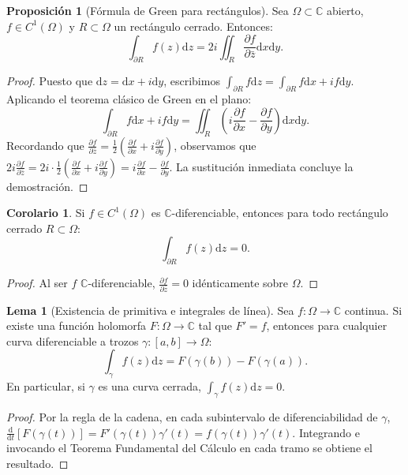 \documentclass[11pt,a4paper]{article}
\theoremstyle{definition}
\newtheorem{proposicion}{Proposición}[section]
\newtheorem{lema}{Lema}[section]
\newtheorem{corolario}{Corolario}[section]
\theoremstyle{remark}
\numberwithin{equation}{section}
\newcommand{\dz}{\mathrm{d}z}
\newcommand{\dt}{\mathrm{d}t}
\begin{document}
\begin{proposicion}[Fórmula de Green para rectángulos]
Sea $\Omega \subset \mathbb{C}$ abierto, $f \in C^1(\Omega)$ y $R \subset \Omega$ un rectángulo cerrado. Entonces:
\begin{equation}
\int_{\partial R} f(z) \dz = 2i \iint_R \frac{\partial f}{\partial \bar{z}} \mathrm{d}x\mathrm{d}y.
\end{equation}
\end{proposicion}
\begin{proof}
Puesto que $\dz = \mathrm{d}x + i\mathrm{d}y$, escribimos $\int_{\partial R} f \dz = \int_{\partial R} f \mathrm{d}x + i f \mathrm{d}y$. Aplicando el teorema clásico de Green en el plano:
\[
\int_{\partial R} f \mathrm{d}x + if \mathrm{d}y = \iint_R \left( i\frac{\partial f}{\partial x} - \frac{\partial f}{\partial y} \right) \mathrm{d}x\mathrm{d}y.
\]
Recordando que $\frac{\partial f}{\partial \bar{z}} = \frac{1}{2}\left(\frac{\partial f}{\partial x} + i\frac{\partial f}{\partial y}\right)$, observamos que $2i \frac{\partial f}{\partial \bar{z}} = 2i \cdot \frac{1}{2}\left(\frac{\partial f}{\partial x} + i\frac{\partial f}{\partial y}\right) = i\frac{\partial f}{\partial x} - \frac{\partial f}{\partial y}$. La sustitución inmediata concluye la demostración.
\end{proof}

\begin{corolario}
Si $f \in C^1(\Omega)$ es $\mathbb{C}$-diferenciable, entonces para todo rectángulo cerrado $R \subset \Omega$:
\begin{equation}
\int_{\partial R} f(z) \dz = 0.
\end{equation}
\end{corolario}
\begin{proof}
Al ser $f$ $\mathbb{C}$-diferenciable, $\frac{\partial f}{\partial \bar{z}} = 0$ idénticamente sobre $\Omega$.
\end{proof}

\begin{lema}[Existencia de primitiva e integrales de línea]
Sea $f: \Omega \to \mathbb{C}$ continua. Si existe una función holomorfa $F: \Omega \to \mathbb{C}$ tal que $F' = f$, entonces para cualquier curva diferenciable a trozos $\gamma: [a,b] \to \Omega$:
\begin{equation}
\int_\gamma f(z) \dz = F(\gamma(b)) - F(\gamma(a)).
\end{equation}
En particular, si $\gamma$ es una curva cerrada, $\int_\gamma f(z) \dz = 0$.
\end{lema}
\begin{proof}
Por la regla de la cadena, en cada subintervalo de diferenciabilidad de $\gamma$, $\frac{\mathrm{d}}{\dt} [F(\gamma(t))] = F'(\gamma(t))\gamma'(t) = f(\gamma(t))\gamma'(t)$. Integrando e invocando el Teorema Fundamental del Cálculo en cada tramo se obtiene el resultado.
\end{proof}
\end{document}

